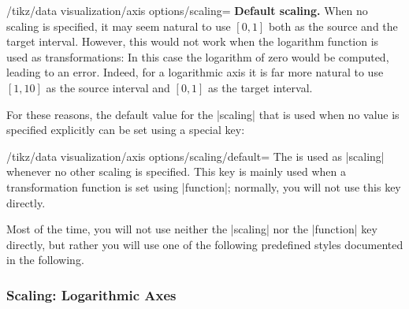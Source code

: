 \begin{key}{/tikz/data visualization/axis options/scaling=}
    \medskip
    \textbf{Default scaling.}
    When no scaling is specified, it may seem natural to use $[0,1]$ both as
    the source and the target interval. However, this would not work when the
    logarithm function is used as transformations: In this case the logarithm
    of zero would be computed, leading to an error. Indeed, for a logarithmic
    axis it is far more natural to use $[1,10]$ as the source interval and
    $[0,1]$ as the target interval.

    For these reasons, the default value for the |scaling| that is used when no
    value is specified explicitly can be set using a special key:
    \begin{key}{/tikz/data visualization/axis options/scaling/default=}
        The  is used as |scaling| whenever no other scaling is
        specified. This key is mainly used when a transformation function is
        set using |function|; normally, you will not use this key directly.
    \end{key}
\end{key}

Most of the time, you will not use neither the |scaling| nor the |function| key
directly, but rather you will use one of the following predefined styles
documented in the following.


\subsubsection{Scaling: Logarithmic Axes}

